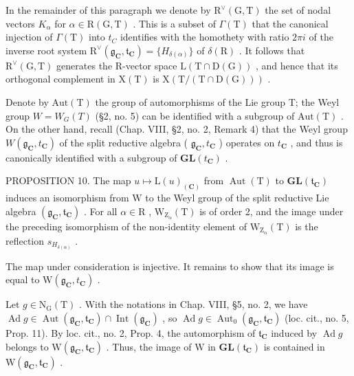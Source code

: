 In the remainder of this paragraph we denote by \(\mathrm{R}^{\vee}(\mathrm{G},\mathrm{T})\) the set of nodal vectors \(K_{\alpha}\) for \(\alpha\in\mathrm{R}(\mathrm{G},\mathrm{T})\) . This is a subset of \(\varGamma(\mathrm{T})\) that the canonical injection of \(\varGamma(\mathrm{T})\) into \(t_{C}\) identifies with the homothety with ratio \(2\pi i\) of the inverse root system \(\mathrm{R}^{\vee}(\mathfrak{g}_{\mathbf{C}},\mathfrak{t}_{\mathbf{C}})=\{H_{\delta(\alpha)}\}\) of \(\delta(\mathrm{R})\) . It follows that \(\mathrm{R}^{\vee}(\mathrm{G},\mathrm{T})\) generates the R-vector space \(\mathrm{L}(\mathrm{T}\cap\mathrm{D}(\mathrm{G}))\) , and hence that its orthogonal complement in \(\mathrm{X}(\mathrm{T})\) is \(\mathrm{X}(\mathrm{T}/(\mathrm{T}\cap\mathrm{D}(\mathrm{G})))\) .

Denote by \(\mathrm{Aut(T)}\) the group of automorphisms of the Lie group T; the Weyl group \(W = W_{G}(T)\) (§2, no. 5) can be identified with a subgroup of \(\mathrm{Aut(T)}\) . On the other hand, recall (Chap. VIII, §2, no. 2, Remark 4) that the Weyl group \(W(\mathfrak{g}_{\mathbf{C}}, t_{\mathbf{C}})\) of the split reductive algebra ( \(\mathfrak{g}_{\mathbf{C}}, t_{\mathbf{C}}\) ) operates on \(t_{\mathbf{C}}\) , and thus is canonically identified with a subgroup of \(\mathbf{GL}(t_{\mathbf{C}})\) .

PROPOSITION 10. The map \(u \mapsto \mathrm{L}(u)_{(\mathbf{C})}\) from \(\operatorname{Aut}(\mathrm{T})\) to \(\mathbf{GL}(\mathfrak{t}_{\mathbf{C}})\) induces an isomorphism from \(\mathrm{W}\) to the Weyl group of the split reductive Lie algebra \((\mathfrak{g}_{\mathbf{C}}, \mathfrak{t}_{\mathbf{C}})\) . For all \(\alpha \in \mathrm{R}\) , \(\mathrm{W}_{\mathrm{Z}_{\alpha}}(\mathrm{T})\) is of order 2, and the image under the preceding isomorphism of the non-identity element of \(\mathrm{W}_{\mathrm{Z}_{\alpha}}(\mathrm{T})\) is the reflection \(s_{H_{\delta(\alpha)}}\) .

The map under consideration is injective. It remains to show that its image is equal to \(\mathrm{W}(\mathfrak{g}_{\mathbf{C}}, t_{\mathbf{C}})\) .

Let \(g \in \mathrm{N}_{\mathrm{G}}(\mathrm{T})\) . With the notations in Chap. VIII, §5, no. 2, we have \(\operatorname{Ad} g \in \operatorname{Aut}(\mathfrak{g}_{\mathbf{C}}, \mathfrak{t}_{\mathbf{C}}) \cap \operatorname{Int}(\mathfrak{g}_{\mathbf{C}})\) , so \(\operatorname{Ad} g \in \operatorname{Aut}_{0}(\mathfrak{g}_{\mathbf{C}}, \mathfrak{t}_{\mathbf{C}})\) (loc. cit., no. 5, Prop. 11). By loc. cit., no. 2, Prop. 4, the automorphism of \(\mathfrak{t}_{\mathbf{C}}\) induced by \(\operatorname{Ad} g\) belongs to \(\mathrm{W}(\mathfrak{g}_{\mathbf{C}}, \mathfrak{t}_{\mathbf{C}})\) . Thus, the image of \(\mathrm{W}\) in \(\mathbf{GL}(\mathfrak{t}_{\mathbf{C}})\) is contained in \(\mathrm{W}(\mathfrak{g}_{\mathbf{C}}, \mathfrak{t}_{\mathbf{C}})\) .

